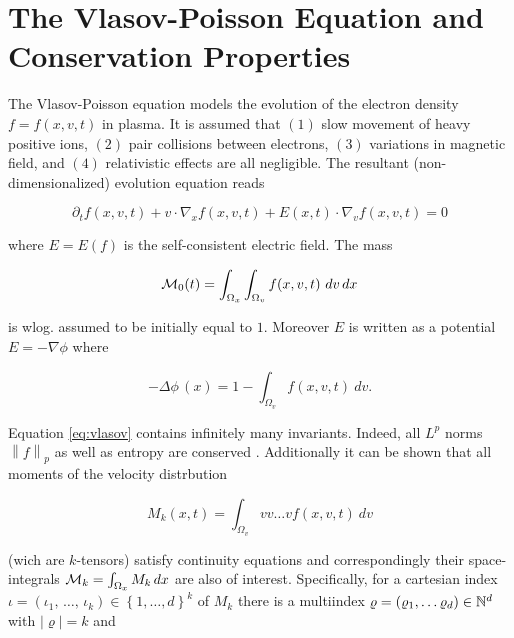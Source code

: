 
\section{The Vlasov-Poisson Equation and Conservation Properties}\label{sec:vlasov}

The Vlasov-Poisson equation models the evolution of the electron density $f = f(x, v, t)$ 
in plasma. It is assumed that $(1)$ slow movement of heavy positive ions, $(2)$ pair 
collisions between electrons, $(3)$ variations in magnetic field, and $(4)$ relativistic 
effects are all negligible. The resultant (non-dimensionalized) evolution equation reads

\begin{equation}\label{eq:vlasov}
    \partial_t f (x, v, t) 
    + v \cdot \nabla_x f (x, v, t) 
    + E (x, t) \cdot \nabla_v f (x, v, t) = 0
\end{equation}

where $E = E(f)$ is the self-consistent electric field. The mass 

\begin{equation}
    \mathcal{M}_0 (t) = \int_{\Omega_x} \int_{\Omega_v} f(x, v, t)\ dv\, dx
\end{equation}

is wlog. assumed to be initially equal to $1$. Moreover $E$ is written as a potential 
$E = - \nabla \phi$ where 

\begin{equation}
    - \Delta \phi\,(x) = 1 - \int_{\Omega_v} f(x, v, t)\ dv . 
\end{equation}

Equation \ref{eq:vlasov} contains infinitely many invariants. Indeed, all $L^p$
norms $\left\| f \right\|_p$ as well as entropy are conserved
\cite{MORRISON1980383,CROUSEILLES2015224}. Additionally it can be shown that all
moments of the velocity distrbution

\begin{equation}
    M_k (x, t) = \int_{\Omega_v} v v \ldots v f(x, v, t)\ dv 
\end{equation}

(wich are $k$-tensors) satisfy continuity equations and correspondingly their 
space-integrals $\mathcal{M}_k = \int_{\Omega_x} M_k\, dx$ are also of interest. Specifically, 
for a cartesian index 
$\iota = (\iota_1,\, \ldots,\, \iota_k) \in \left\{ 1, \ldots, d \right\}^k$ of $M_k$ 
there is a multiindex $\varrho = \left( \varrho_1, \ldots \varrho_d \right) \in \mathbb{N}^d$ with 
$| \varrho | = k$ and 

